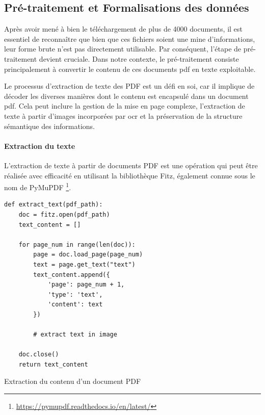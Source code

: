 \subsection{Pré-traitement et Formalisations des données}

Après avoir mené à bien le téléchargement de plus de 4000 documents, il est essentiel de reconnaître que bien que ces fichiers soient une mine d'informations, leur forme brute n'est pas directement utilisable. Par conséquent, l'étape de pré-traitement devient cruciale. Dans notre contexte, le pré-traitement consiste principalement à convertir le contenu de ces documents \acs{pdf} en texte exploitable.

Le processus d'extraction de texte des PDF est un défi en soi, car il implique de décoder les diverses manières dont le contenu est encapsulé dans un document \acs{pdf}. Cela peut inclure la gestion de la mise en page complexe, l'extraction de texte à partir d'images incorporées par \ac{ocr} et la préservation de la structure sémantique des informations.

\paragraph{Extraction du texte} \hspace{0pt}

L'extraction de texte à partir de documents PDF est une opération qui peut être réalisée avec efficacité en utilisant la bibliothèque Fitz, également connue sous le nom de PyMuPDF \footnote{\href{https://pymupdf.readthedocs.io/en/latest/}{https://pymupdf.readthedocs.io/en/latest/}}.

\begin{listing}[!ht]
\begin{verbatim}
def extract_text(pdf_path):
    doc = fitz.open(pdf_path)
    text_content = []

    for page_num in range(len(doc)):
        page = doc.load_page(page_num)
        text = page.get_text("text")
        text_content.append({
            'page': page_num + 1, 
            'type': 'text', 
            'content': text
        })

        # extract text in image

    doc.close()
    return text_content
\end{verbatim}
\caption{Extraction du contenu d'un document PDF}
\label{appendix:code:python:remove-fragment}
\end{listing}

